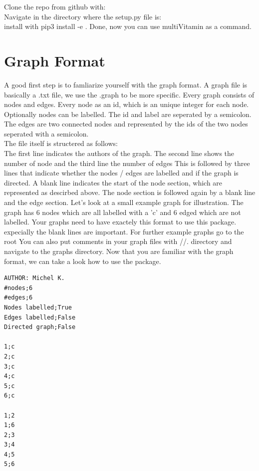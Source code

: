 \documentclass{SeminarV2}
\begin{document}
Clone the repo from github with: \\
Navigate in the directory where the setup.py file is: \\
install with pip3 install -e .
Done, now you can use multiVitamin as a command.



\section{Graph Format}

A good first step is to famliarize yourself with the graph format. A graph
file is basically a .txt file, we use the .graph to be more specific.
Every graph consists of nodes and edges. Every node as an id, which is an unique
integer for each node. Optionally nodes can be labelled. The id and label are
seperated by a semicolon. The edges are two connected nodes and represented
by the ids of the two nodes seperated with a semicolon.\\
The file itself is structered as follows: \\
The first line indicates the authors of the graph. The second line shows the number
of node and the third line the number of edges
This is followed by three lines
that indicate whether the nodes / edges are labelled and if the graph is directed.
A blank line indicates the start of the node section, which are represented as
descirbed above. The node section is followed again by a blank line and the edge section.
Let's look at a small example graph for illustration. The graph has 6 nodes
which are all labelled with a 'c' and 6 edged which are not labelled.
Your graphs need to have exactely this format to use this package. expecially
the blank lines are important. For further example graphs go to the root
You can also put comments in your graph files with //.
directory and navigate to the graphs directory. Now that you are familiar with
the graph format, we can take a look how to use the package.
\begin{verbatim}
AUTHOR: Michel K.
#nodes;6
#edges;6
Nodes labelled;True
Edges labelled;False
Directed graph;False

1;c
2;c
3;c
4;c
5;c
6;c

1;2
1;6
2;3
3;4
4;5
5;6
\end{verbatim}
\end{document}
